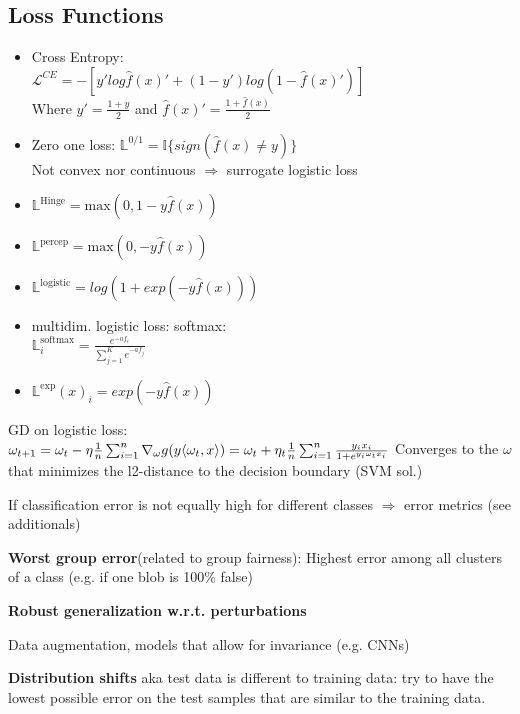 \subsection{Loss Functions}

\begin{itemize}
    \item Cross Entropy: \\$\mathcal{L}^{CE} = -\left[y'log\hat{f}(x)' + (1-y')log(1-\hat{f}(x)')\right]$\\
    Where $y' = \frac{1+y}{2}$ and $\hat{f}(x)' = \frac{1+\hat{f}(x)}{2}$
    \item Zero one loss: $\mathbb{L}^{0/1} = \mathbb{I}\{sign(\hat{f}(x) \neq y)\}$\\
    Not convex nor continuous $\Rightarrow$ surrogate logistic loss 
    \item $\mathbb{L}^{\text{Hinge}
    } = \text{max}(0,1-y\hat{f}(x))$
    \item $\mathbb{L}^{\text{percep}} = \text{max}(0, - y\hat{f}(x))$
    \item $\mathbb{L}^{\text{logistic}} = log(1 + exp(-y\hat{f}(x)))$
    \columnbreak\vfill
    \item multidim. logistic loss: softmax: \\
    $\mathbb{L}^{\text{softmax}}_i = \frac{e^{-af_i}}{\sum_{j=1}^{K}e^{-af_j}}$
    \item $\mathbb{L}^{\text{exp}}(x)_i = exp(-y\hat{f}(x))$
\end{itemize}

GD on logistic loss:\\
$\omega_{t+1} = \omega_t - \eta \frac{1}{n}\sum_{i=1}^n\nabla_\omega g(y\langle\omega_t,x\rangle) = \\\omega_t + \eta_t \frac{1}{n}\sum_{i=1}^n\frac{y_ix_i}{1+e^{y_i\omega_tx_i}}$ Converges to the $\omega$ that minimizes the l2-distance to the decision boundary (SVM sol.)

If classification error is not equally high for different classes $\Rightarrow$ error metrics (see additionals)

\textbf{Worst group error}(related to group fairness): Highest error among all clusters of a class (e.g. if one blob is 100\% false)

\textbf{Robust generalization w.r.t. perturbations}

Data augmentation, models that allow for invariance (e.g. CNNs)

\textbf{Distribution shifts} aka test data is different to training data: try to have the lowest possible error on the test samples that are similar to the training data.



